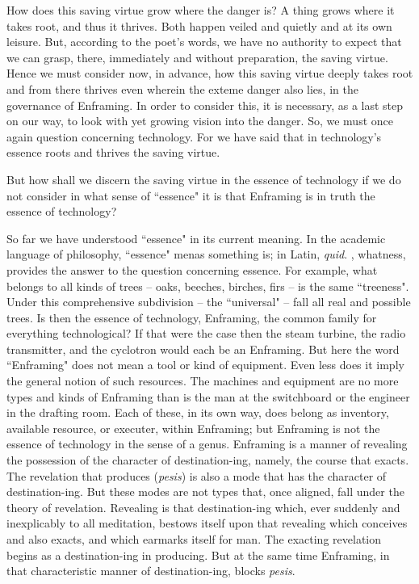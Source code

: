 \documentclass[12pt]{article}
\begin{document}
How does this saving virtue grow where the danger is?  A thing grows where it takes root, and thus it thrives. Both happen veiled and quietly and at its own leisure.  But, according to the poet's words, we have no authority to expect that we can grasp, there, immediately and without preparation, the saving virtue. Hence we must consider now, in advance, how this saving virtue deeply takes root and from there thrives even wherein the exteme danger also lies, in the governance of Enframing. In order to consider this, it is necessary, as a last step on our way, to look with yet growing vision into the danger. So, we must once again question concerning technology. For we have said that in technology's essence roots and thrives the saving virtue.

But how shall we discern the saving virtue in the essence of technology if we do not consider in what sense of ``essence" it is that Enframing is in truth the essence of technology?

So far we have understood ``essence" in its current meaning. In the academic language of philosophy, ``essence" menas  something is; in Latin, \textit{quid}. , whatness, provides the answer to the question concerning essence. For example, what belongs to all kinds of trees -- oaks, beeches, birches, firs -- is the same ``treeness". Under this comprehensive subdivision -- the ``universal" -- fall all real and possible trees. Is then the essence of technology, Enframing, the common family for everything technological? If that were the case then the steam turbine, the radio transmitter, and the cyclotron would each be an Enframing. But here the word ``Enframing" does not mean a tool or kind of equipment. Even less does it imply the general notion of such resources. The machines and equipment are no more types and kinds of Enframing than is the man at the switchboard or the engineer in the drafting room. Each of these, in its own way, does belong as inventory, available resource, or executer, within Enframing; but Enframing is not the essence of technology in the sense of a genus. Enframing is a manner of revealing the possession of the character of destination-ing, namely, the course that exacts. The revelation that produces (\textit{pesis}) is also a mode that has the character of destination-ing. But these modes are not types that, once aligned, fall under the theory of revelation. Revealing is that destination-ing which, ever suddenly and inexplicably to all meditation, bestows itself upon that revealing which conceives and also exacts, and which earmarks itself for man. The exacting revelation begins as a destination-ing in producing. But at the same time Enframing, in that characteristic manner of destination-ing, blocks \textit{pesis}.
\end{document}
